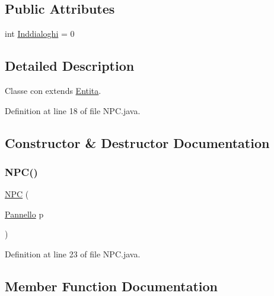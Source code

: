 \subsection*{Public Attributes}
\begin{DoxyCompactItemize}
\item 
int \hyperlink{class_entita_1_1_n_p_c_a4fd5256973eb06099caa850f515199bb}{Inddialoghi} = 0
\end{DoxyCompactItemize}


\subsection{Detailed Description}
Classe con extends \hyperlink{class_entita_1_1_entita}{Entita}. 

Definition at line 18 of file N\+P\+C.\+java.



\subsection{Constructor \& Destructor Documentation}
\mbox{\label{class_entita_1_1_n_p_c_a1768c917a5c9f132e9edae07318c9aac}} 
\subsubsection{\texorpdfstring{N\+P\+C()}{NPC()}}
{\footnotesize\ttfamily \hyperlink{class_entita_1_1_n_p_c}{N\+PC} (\begin{DoxyParamCaption}\item[{\hyperlink{classa_1_1survival_1_1game_1_1_pannello}{Pannello}}]{p }\end{DoxyParamCaption})}



Definition at line 23 of file N\+P\+C.\+java.



\subsection{Member Function Documentation}
\mbox{\label{class_entita_1_1_n_p_c_a8310c90e226ac9bc11547a3adb9cd0f3}} 
